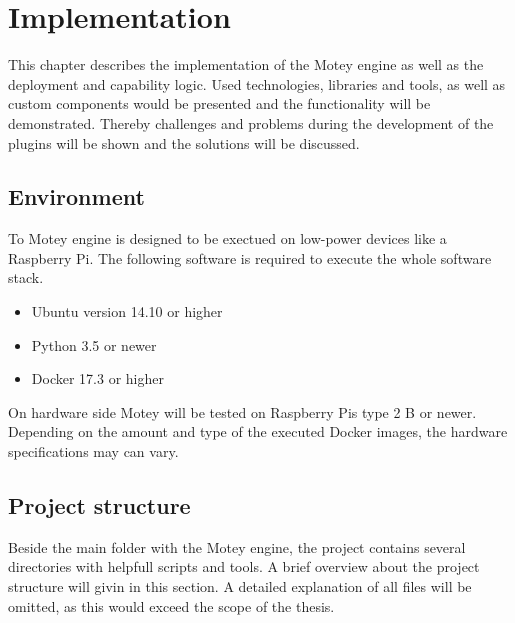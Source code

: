 \chapter{Implementation}\label{chapter:implementation}
This chapter describes the implementation of the Motey engine as well as the deployment and capability logic.
Used technologies, libraries and tools, as well as custom components would be presented and the functionality will be demonstrated.
Thereby challenges and problems during the development of the plugins will be shown and the solutions will be discussed.

\section{Environment}
To Motey engine is designed to be exectued on low-power devices like a Raspberry Pi.
The following software is required to execute the whole software stack.
\begin{itemize}
  \item Ubuntu version 14.10 or higher
  \item Python 3.5 or newer
  \item Docker 17.3 or higher
\end{itemize}
On hardware side Motey will be tested on Raspberry Pis type 2 B or newer.
Depending on the amount and type of the executed Docker images, the hardware specifications may can vary.

\section{Project structure}

Beside the main folder with the Motey engine, the project contains several directories with helpfull scripts and tools.
A brief overview about the project structure will givin in this section.
A detailed explanation of all files will be omitted, as this would exceed the scope of the thesis.

